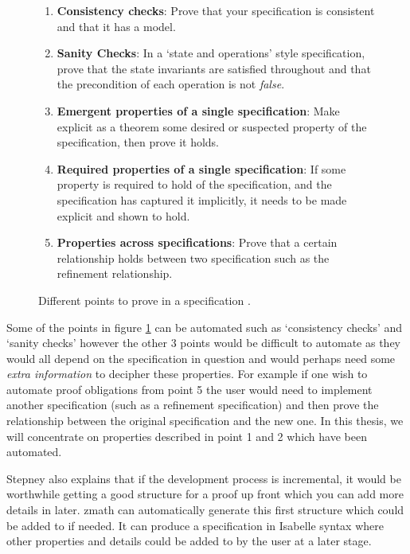 \begin{figure}[H]
\begin{enumerate}
\item \textbf{Consistency checks}: Prove that your specification is consistent
and that it has a model.

\item \textbf{Sanity Checks}: In a `state and operations' style specification,
prove that the state invariants are satisfied throughout and that the
precondition of each operation is not \emph{false}.

\item \textbf{Emergent properties of a single specification}: Make explicit as a
theorem some desired or suspected property of the specification, then prove it
holds.

\item \textbf{Required properties of a single specification}: If some property
is required to hold of the specification, and the specification has captured it
implicitly, it needs to be made explicit and shown to hold.

\item \textbf{Properties across specifications}: Prove that a certain
relationship holds between two specification such as the refinement
relationship.
\end{enumerate}
\caption{Different points to prove in a specification \cite{stepney1998tale}. \label{fig:ptp}}
\end{figure}

Some of the points in figure \ref{fig:ptp} can be automated such
as `consistency checks' and `sanity checks' however the other 3 points would be
difficult to automate as they would all depend on the specification in question
and would perhaps need some \emph{extra information} to decipher these
properties. For example if one wish to automate proof obligations from point 5
the user would need to implement another specification (such as a refinement
specification) and then prove the relationship between the original
specification and the new one. In this thesis, we will concentrate on properties
described in point 1 and 2 which have been automated. 

Stepney also explains that if the development process is incremental, it would
be worthwhile getting a good structure for a proof up front which you can add
more details in later. \gls{zmath}  can automatically generate this first
structure which could be added to if needed. It can produce a specification in
Isabelle syntax where other properties and details could be added to by the user
at a later stage.

